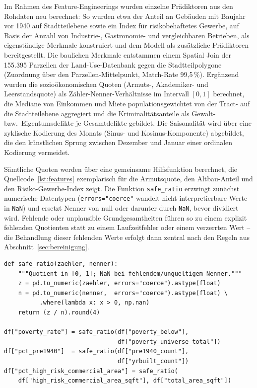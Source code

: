 Im Rahmen des Feature-Engineerings wurden einzelne Prädiktoren aus den
Rohdaten neu berechnet: So wurden etwa der Anteil an Gebäuden mit Baujahr
vor 1940 auf Stadtteilebene sowie ein Index für risikobehaftetes Gewerbe,
auf Basis der Anzahl von Industrie-, Gastronomie- und vergleichbaren
Betrieben, als eigenständige Merkmale konstruiert und dem Modell als
zusätzliche Prädiktoren bereitgestellt.
Die baulichen Merkmale entstammen einem Spatial Join der 155.395 Parzellen
der Land-Use-Datenbank gegen die Stadtteilpolygone (Zuordnung über den
Parzellen-Mittelpunkt, Match-Rate 99,5\,\%). Ergänzend wurden die
sozioökonomischen Quoten (Armuts-, Akademiker- und Leerstandsquote) als
Zähler-Nenner-Verhältnisse im Intervall $[0,1]$ berechnet, die Mediane von
Einkommen und Miete populationsgewichtet von der Tract- auf die
Stadtteilebene aggregiert und die Kriminalitätsanteile als Gewalt- bzw.\
Eigentumsdelikte je Gesamtdelikte gebildet. Die Saisonalität wird über eine
zyklische Kodierung des Monats (Sinus- und Kosinus-Komponente) abgebildet,
die den künstlichen Sprung zwischen Dezember und Januar einer ordinalen
Kodierung vermeidet.

Sämtliche Quoten werden über eine gemeinsame Hilfsfunktion berechnet, die
Quellcode~\ref{lst:features} exemplarisch für die Armutsquote, den
Altbau-Anteil und den Risiko-Gewerbe-Index zeigt. Die Funktion
\texttt{safe\_ratio} erzwingt zunächst numerische Datentypen
(\texttt{errors="coerce"} wandelt nicht interpretierbare Werte in
\texttt{NaN}) und ersetzt Nenner von null oder darunter durch \texttt{NaN},
bevor dividiert wird. Fehlende oder unplausible Grundgesamtheiten führen so
zu einem explizit fehlenden Quotienten statt zu einem Laufzeitfehler oder
einem verzerrten Wert -- die Behandlung dieser fehlenden Werte erfolgt dann
zentral nach den Regeln aus Abschnitt~\ref{sec:bereinigung}.

\begin{lstlisting}[caption={Berechnung der Quoten-Merkmale über eine
robuste Verhältnisfunktion (Ausschnitt aus
\texttt{pipeline/03\_features.py})}, label=lst:features]
def safe_ratio(zaehler, nenner):
    """Quotient in [0, 1]; NaN bei fehlendem/ungueltigem Nenner."""
    z = pd.to_numeric(zaehler, errors="coerce").astype(float)
    n = pd.to_numeric(nenner,  errors="coerce").astype(float) \
          .where(lambda x: x > 0, np.nan)
    return (z / n).round(4)

df["poverty_rate"] = safe_ratio(df["poverty_below"],
                                df["poverty_universe_total"])
df["pct_pre1940"]  = safe_ratio(df["pre1940_count"],
                                df["yrbuilt_count"])
df["pct_high_risk_commercial_area"] = safe_ratio(
    df["high_risk_commercial_area_sqft"], df["total_area_sqft"])
\end{lstlisting}

